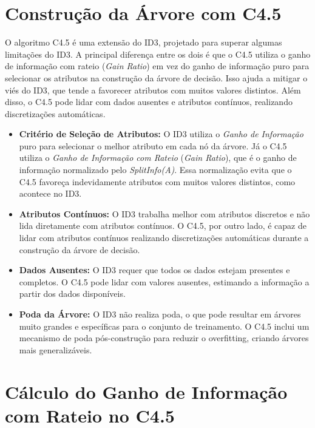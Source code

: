 \documentclass[a4paper,12pt]{article}
\begin{document}
\section{Construção da Árvore com C4.5}

O algoritmo C4.5 é uma extensão do ID3, projetado para superar algumas limitações do ID3. A principal diferença entre os dois é que o C4.5 utiliza o ganho de informação com rateio (\textit{Gain Ratio}) em vez do ganho de informação puro para selecionar os atributos na construção da árvore de decisão. Isso ajuda a mitigar o viés do ID3, que tende a favorecer atributos com muitos valores distintos. Além disso, o C4.5 pode lidar com dados ausentes e atributos contínuos, realizando discretizações automáticas.

\begin{itemize}
    \item \textbf{Critério de Seleção de Atributos:} O ID3 utiliza o \textit{Ganho de Informação} puro para selecionar o melhor atributo em cada nó da árvore. Já o C4.5 utiliza o \textit{Ganho de Informação com Rateio} (\textit{Gain Ratio}), que é o ganho de informação normalizado pelo \textit{SplitInfo(A)}. Essa normalização evita que o C4.5 favoreça indevidamente atributos com muitos valores distintos, como acontece no ID3.
    
    \item \textbf{Atributos Contínuos:} O ID3 trabalha melhor com atributos discretos e não lida diretamente com atributos contínuos. O C4.5, por outro lado, é capaz de lidar com atributos contínuos realizando discretizações automáticas durante a construção da árvore de decisão.
    
    \item \textbf{Dados Ausentes:} O ID3 requer que todos os dados estejam presentes e completos. O C4.5 pode lidar com valores ausentes, estimando a informação a partir dos dados disponíveis.
    
    \item \textbf{Poda da Árvore:} O ID3 não realiza poda, o que pode resultar em árvores muito grandes e específicas para o conjunto de treinamento. O C4.5 inclui um mecanismo de poda pós-construção para reduzir o overfitting, criando árvores mais generalizáveis.
\end{itemize}

\section{Cálculo do Ganho de Informação com Rateio no C4.5}
\end{document}
